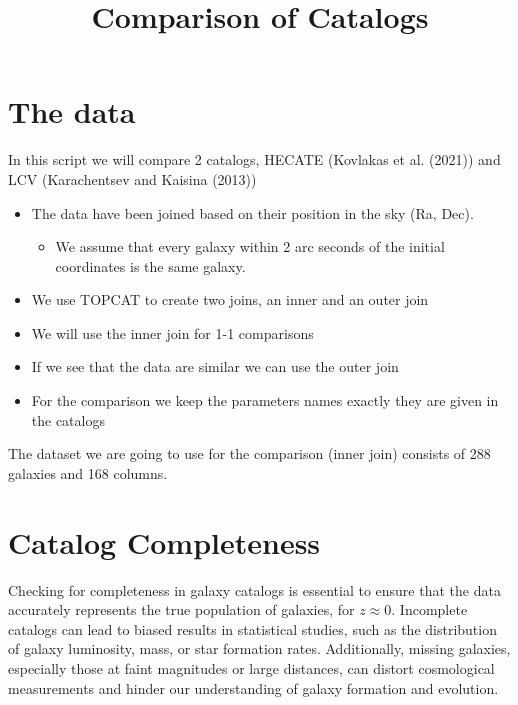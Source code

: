 \documentclass[
]{article}
\title{Comparison of Catalogs}
\author{}
\date{}
\providecommand{\tightlist}{%
  \setlength{\itemsep}{0pt}\setlength{\parskip}{0pt}}\usepackage{longtable,booktabs,array}
\renewcommand*\contentsname{Table of contents}
\newcommand\contentsname{Table of contents}
\begin{document}
\maketitle

\renewcommand*\contentsname{Table of contents}
{
\hypersetup{linkcolor=}
\setcounter{tocdepth}{3}
\tableofcontents
}
\section{The data}\label{the-data}

In this script we will compare 2 catalogs, HECATE (Kovlakas et al.
(2021)) and LCV (Karachentsev and Kaisina (2013))

\begin{itemize}
\tightlist
\item
  The data have been joined based on their position in the sky (Ra,
  Dec).

  \begin{itemize}
  \tightlist
  \item
    We assume that every galaxy within 2 arc seconds of the initial
    coordinates is the same galaxy.
  \end{itemize}
\item
  We use TOPCAT to create two joins, an inner and an outer join
\item
  We will use the inner join for 1-1 comparisons
\item
  If we see that the data are similar we can use the outer join
\item
  For the comparison we keep the parameters names exactly they are given
  in the catalogs
\end{itemize}

The dataset we are going to use for the comparison (inner join) consists
of 288 galaxies and 168 columns.

\section{Catalog Completeness}\label{catalog-completeness}

Checking for completeness in galaxy catalogs is essential to ensure that
the data accurately represents the true population of galaxies, for
\(z \approx 0\). Incomplete catalogs can lead to biased results in
statistical studies, such as the distribution of galaxy luminosity,
mass, or star formation rates. Additionally, missing galaxies,
especially those at faint magnitudes or large distances, can distort
cosmological measurements and hinder our understanding of galaxy
formation and evolution.
\end{document}
